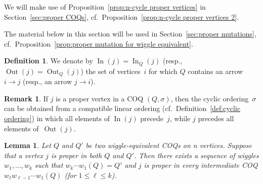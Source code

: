 \documentclass[11pt, letterpaper]{amsart}
\newtheorem{lemma}[theorem]{Lemma}
\theoremstyle{definition}
\newtheorem{remark}[theorem]{Remark}
\newtheorem{definition}[theorem]{Definition}
\numberwithin{equation}{section}
\def\In{{\operatorname{In}}}
\def\Out{{\operatorname{Out}}}
\begin{document}

We will make use of Proposition~\ref{prop:n-cycle proper vertices} in Section~\ref{sec:proper COQs},
cf.\ Proposition~\ref{prop:n-cycle proper vertices 2}. 

\medskip

The material below in this section will be used in Section~\ref{sec:proper mutations},
cf.\ Proposition~\ref{prop:proper mutation for wiggle equivalent}. 

\begin{definition}
\label{def:IOsets}
 We denote by $\In(j)=\In_Q(j)$ (resp., $\Out(j)=\Out_Q(j)$) the set of vertices~$i$ for which $Q$ contains an arrow $i \rightarrow j$ 
 (resp., an arrow $j \rightarrow i$). %
\end{definition}

\begin{remark}
\label{rem:In-Out-proper}
If $j$ is a proper vertex in a COQ $(Q,\sigma)$, then the cyclic ordering~$\sigma$ 
can be obtained from a compatible linear ordering (cf.\ Definition~\ref{def:cyclic ordering})
in which all elements of $\In(j)$ precede~$j$, 
while $j$ precedes all elements of~$\Out(j)$.
\end{remark}

\begin{lemma}
\label{lem:preserve j proper wiggles}
 Let $Q$ and $Q'$ be two wiggle-equivalent COQs on n vertices. 
 Suppose that a vertex $j$ is proper in both $Q$ and $Q'$. 
 Then there exists a sequence of wiggles $w_1,\ldots , w_k$ such that $w_k \cdots w_1(Q) = Q'$ and $j$ is proper in every intermediate COQ $w_\ell w_{\ell-1} \cdots w_1 (Q)$ (for $1 \leq \ell \leq k$).
\end{lemma}
\end{document}
